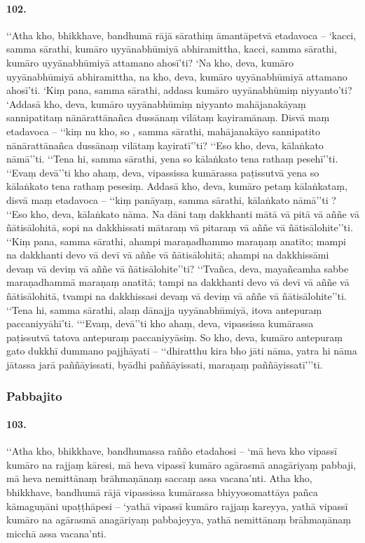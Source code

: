 \paragraph{102.} ‘‘Atha kho, bhikkhave, bandhumā rājā sārathiṃ āmantāpetvā etadavoca – ‘kacci, samma sārathi, kumāro uyyānabhūmiyā abhiramittha, kacci, samma sārathi, kumāro uyyānabhūmiyā attamano ahosī’ti? ‘Na kho, deva, kumāro uyyānabhūmiyā abhiramittha, na kho, deva, kumāro uyyānabhūmiyā attamano ahosī’ti. ‘Kiṃ pana, samma sārathi, addasa kumāro uyyānabhūmiṃ niyyanto’ti? ‘Addasā kho, deva, kumāro uyyānabhūmiṃ niyyanto mahājanakāyaṃ sannipatitaṃ nānārattānañca dussānaṃ vilātaṃ kayiramānaṃ. Disvā maṃ etadavoca – ‘‘kiṃ nu kho, so , samma sārathi, mahājanakāyo sannipatito nānārattānañca dussānaṃ vilātaṃ kayiratī’’ti? ‘‘Eso kho, deva, kālaṅkato nāmā’’ti. ‘‘Tena hi, samma sārathi, yena so kālaṅkato tena rathaṃ pesehī’’ti. ‘‘Evaṃ devā’’ti kho ahaṃ, deva, vipassissa kumārassa paṭissutvā yena so kālaṅkato tena rathaṃ pesesiṃ. Addasā kho, deva, kumāro petaṃ kālaṅkataṃ, disvā maṃ etadavoca – ‘‘kiṃ panāyaṃ, samma sārathi, kālaṅkato nāmā’’ti ? ‘‘Eso kho, deva, kālaṅkato nāma. Na dāni taṃ dakkhanti mātā vā pitā vā aññe vā ñātisālohitā, sopi na dakkhissati mātaraṃ vā pitaraṃ vā aññe vā ñātisālohite’’ti. ‘‘Kiṃ pana, samma sārathi, ahampi maraṇadhammo maraṇaṃ anatīto; mampi na dakkhanti devo vā devī vā aññe vā ñātisālohitā; ahampi na dakkhissāmi devaṃ vā deviṃ vā aññe vā ñātisālohite’’ti? ‘‘Tvañca, deva, mayañcamha sabbe maraṇadhammā maraṇaṃ anatītā; tampi na dakkhanti devo vā devī vā aññe vā ñātisālohitā, tvampi na dakkhissasi devaṃ vā deviṃ vā aññe vā ñātisālohite’’ti. ‘‘Tena hi, samma sārathi, alaṃ dānajja uyyānabhūmiyā, itova antepuraṃ paccaniyyāhī’ti. ‘‘‘Evaṃ, devā’’ti kho ahaṃ, deva, vipassissa kumārassa paṭissutvā tatova antepuraṃ paccaniyyāsiṃ. So kho, deva, kumāro antepuraṃ gato dukkhī dummano pajjhāyati – ‘‘dhiratthu kira bho jāti nāma, yatra hi nāma jātassa jarā paññāyissati, byādhi paññāyissati, maraṇaṃ paññāyissatī’’’ti.

\subsubsection{Pabbajito}

\paragraph{103.} ‘‘Atha kho, bhikkhave, bandhumassa rañño etadahosi – ‘mā heva kho vipassī kumāro na rajjaṃ kāresi, mā heva vipassī kumāro agārasmā anagāriyaṃ pabbaji, mā heva nemittānaṃ brāhmaṇānaṃ saccaṃ assa vacana’nti. Atha kho, bhikkhave, bandhumā rājā vipassissa kumārassa bhiyyosomattāya pañca kāmaguṇāni upaṭṭhāpesi – ‘yathā vipassī kumāro rajjaṃ kareyya, yathā vipassī kumāro na agārasmā anagāriyaṃ pabbajeyya, yathā nemittānaṃ brāhmaṇānaṃ micchā assa vacana’nti.

